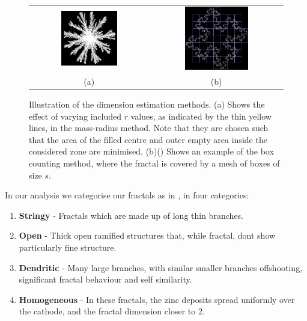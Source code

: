 \documentclass{article}
\theoremstyle{definition}
\theoremstyle{remark}
\begin{document}
\begin{figure}[H]
        \begin{tabular}{cc}
                \centering
                \includegraphics[width=0.5\textwidth]{radius_cutting_img.png} & \includegraphics[width=0.5\textwidth]{Boxcounting.png}\\
                (a) & (b)
        \end{tabular}
        \caption{\label{fig:radiuscutting}Illustration of the dimension estimation methods. (a) Shows the effect of varying included $r$ values, as indicated by the thin yellow lines, in the mass-radius method. Note that they are chosen such that the area of the filled centre and outer empty area inside the considered zone are minimised. (b)(\cite{ImageJ}) Shows an example of the box counting method, where the fractal is covered by a mesh of boxes of size $s$.}
\end{figure}

\indent In our analysis we categorise our fractals as in \cite{PhysRevLett.56.1260}, in four categories:
\begin{enumerate}
        \item \textbf{Stringy} - Fractals which are made up of long thin branches.
        \item \textbf{Open} - Thick open ramified structures that, while fractal, dont show particularly fine structure.
        \item \textbf{Dendritic} - Many large branches, with similar smaller branches offshooting, significant fractal behaviour and self similarity. 
        \item \textbf{Homogeneous} - In these fractals, the zinc deposits spread uniformly over the cathode, and the fractal dimension closer to 2.
\end{enumerate}
\end{document}
